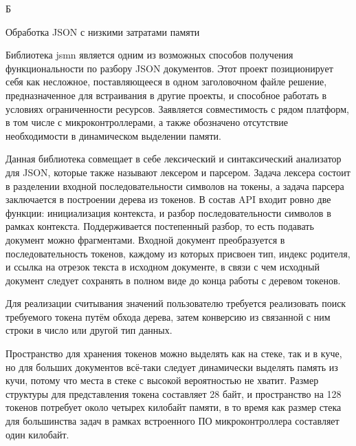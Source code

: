 \documentclass{report}
\begin{document}



\begin{flushright}
     Б
\end{flushright}

\begin{center}   Обработка JSON с низкими затратами памяти \end{center}

Библиотека jsmn является одним из возможных способов получения функциональности по разбору JSON документов. Этот проект позиционирует себя как несложное, поставляющееся в одном заголовочном файле решение, предназначенное для встраивания в другие проекты, и способное работать в условиях ограниченности ресурсов. Заявляется совместимость с рядом платформ, в том числе с микроконтроллерами, а также обозначено отсутствие необходимости в динамическом выделении памяти.

Данная библиотека совмещает в себе лексический и синтаксический анализатор для JSON, которые также называют лексером и парсером. Задача лексера состоит в разделении входной последовательности символов на токены, а задача парсера заключается в построении дерева из токенов. В состав API входит ровно две функции: инициализация контекста, и разбор последовательности символов в рамках контекста. Поддерживается постепенный разбор, то есть подавать документ можно фрагментами. Входной документ преобразуется в последовательность токенов, каждому из которых присвоен тип, индекс родителя, и ссылка на отрезок текста в исходном документе, в связи с чем исходный документ следует сохранять в полном виде до конца работы с деревом токенов.

Для реализации считывания значений пользователю требуется реализовать поиск требуемого токена путём обхода дерева, затем конверсию из связанной с ним строки в число или другой тип данных.

Пространство для хранения токенов можно выделять как на стеке, так и в куче, но для больших документов всё-таки следует динамически выделять память из кучи, потому что места в стеке с высокой вероятностью не хватит. Размер структуры для представления токена составляет 28 байт, и пространство на 128 токенов потребует около четырех килобайт памяти, в то время как размер стека для большинства задач в рамках встроенного ПО микроконтроллера составляет один килобайт.
\end{document}
